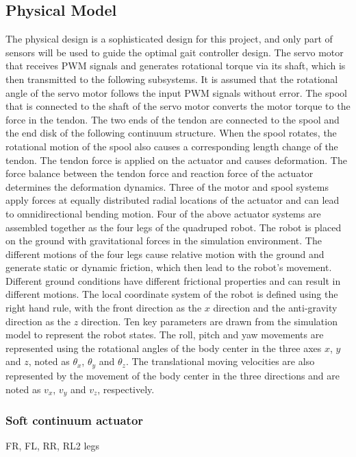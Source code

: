 \subsection{Physical Model}
The physical design is a sophisticated design for this project, and only part of sensors will be used to guide the optimal gait controller design. The servo motor that receives \ac{PWM} signals and generates rotational torque via its shaft, which is then transmitted to the following subsystems. It is assumed that the rotational angle of the servo motor follows the input \ac{PWM} signals without error. The spool that is connected to the shaft of the servo motor converts the motor torque to the force in the tendon. The two ends of the tendon are connected to the spool and the end disk of the following continuum structure. When the spool rotates, the rotational motion of the spool also causes a corresponding length change of the tendon. The tendon force is applied on the actuator and causes deformation. The force balance between the tendon force and reaction force of the actuator determines the deformation dynamics. Three of the motor and spool systems apply forces at equally distributed radial locations of the actuator and can lead to omnidirectional bending motion. Four of the above actuator systems are assembled together as the four legs of the quadruped robot. The robot is placed on the ground with gravitational forces in the simulation environment. The different motions of the four legs cause relative motion with the ground and generate static or dynamic friction, which then lead to the robot’s movement. Different ground conditions have different frictional properties and can result in different motions.
The local coordinate system of the robot is defined using the right hand rule, with the front direction as the $x$ direction and the anti-gravity direction as the $z$ direction. Ten key parameters are drawn from the simulation model to represent the robot states. The roll, pitch and yaw movements are represented using the rotational angles of the body center in the three axes $x$, $y$ and $z$, noted as $\theta_x$, $\theta_y$ and $\theta_z$. The translational moving velocities are also represented by the movement of the body center in the three directions and are noted as $v_x$, $v_y$ and $v_z$, respectively.
\subsubsection{Soft continuum actuator}

\ac{FR}, \ac{FL}, \ac{RR}, \ac{RL2} legs

